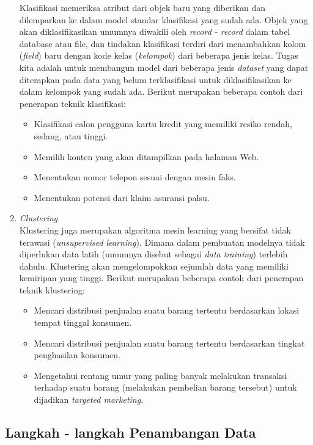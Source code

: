 \begin{enumerate}
	Klasifikasi memeriksa atribut dari objek baru yang diberikan dan dilemparkan ke dalam model standar klasifikasi yang sudah ada. Objek yang akan diklasifikasikan umumnya diwakili oleh \textit{record - record} dalam tabel database atau file, dan tindakan klasifikasi terdiri dari menambahkan kolom (\textit{field}) baru dengan kode kelas (\textit{kelompok}) dari beberapa jenis kelas. Tugas kita adalah untuk membangun model dari beberapa jenis \textit{dataset} yang dapat diterapkan pada data yang belum terklasifikasi untuk diklasifikasikan ke dalam kelompok yang sudah ada. Berikut merupakan beberapa contoh dari penerapan teknik klasifikasi:
\begin{itemize}
	\item Klasifikasi calon pengguna kartu kredit yang memiliki resiko rendah, sedang, atau tinggi.
	\item Memilih konten yang akan ditampilkan pada halaman Web.
	\item Menentukan nomor telepon sesuai dengan mesin faks.
	\item Menentukan potensi dari klaim asuransi palsu.
\end{itemize}
	\item{\textit{Clustering}\cite{book:339389}} \\
	Klustering juga merupakan algoritma mesin learning yang bersifat tidak terawasi (\textit{unsupervised learning}). Dimana dalam pembuatan modelnya tidak diperlukan data latih (umumnya disebut sebagai \textit{data training}) terlebih dahulu. Klustering akan mengelompokkan sejumlah data yang memiliki kemiripan yang tinggi. Berikut merupakan beberapa contoh dari penerapan teknik klustering:
\begin{itemize}
	\item Mencari distribusi penjualan suatu barang tertentu berdasarkan lokasi tempat tinggal konsumen.
	\item Mencari distribusi penjualan suatu barang tertentu berdasarkan tingkat penghasilan konsumen.
	\item Mengetahui rentang umur yang paling banyak melakukan transaksi terhadap suatu barang (melakukan pembelian barang tersebut) untuk dijadikan \textit{targeted marketing}.
\end{itemize}
\end{enumerate}

\subsection{Langkah - langkah Penambangan Data}

